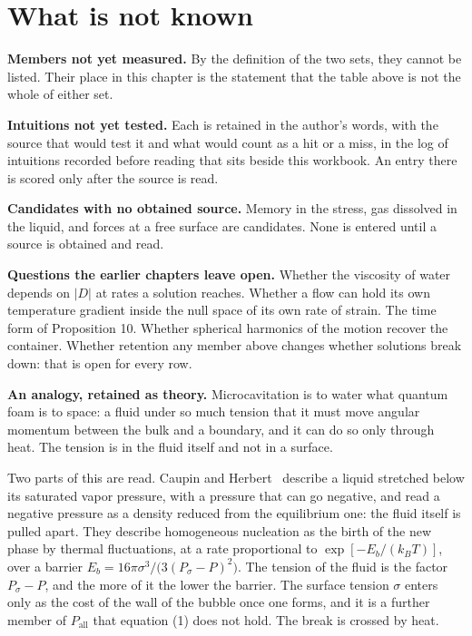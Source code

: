 \section{What is not known}

\textbf{Members not yet measured.} By the definition of the two sets, they cannot be listed. Their
place in this chapter is the statement that the table above is not the whole of either set.

\textbf{Intuitions not yet tested.} Each is retained in the author's words, with the source that would
test it and what would count as a hit or a miss, in the log of intuitions recorded before reading
that sits beside this workbook. An entry there is scored only after the source is read.

\textbf{Candidates with no obtained source.} Memory in the stress, gas dissolved in the liquid, and
forces at a free surface are candidates. None is entered until a source is obtained and read.

\textbf{Questions the earlier chapters leave open.} Whether the viscosity of water depends on $|D|$
at rates a solution reaches. Whether a flow can hold its own temperature gradient inside the null
space of its own rate of strain. The time form of Proposition 10. Whether spherical harmonics of
the motion recover the container. Whether retention any member above changes whether solutions break
down: that is open for every row.

\textbf{An analogy, retained as theory.} Microcavitation is to water what quantum foam is to space: a
fluid under so much tension that it must move angular momentum between the bulk and a boundary,
and it can do so only through heat. The tension is in the fluid itself and not in a surface.

Two parts of this are read. Caupin and Herbert~\cite{src:Caupin-and-Herbert-2006} describe a liquid stretched below its saturated
vapor pressure, with a pressure that can go negative, and read a negative pressure as a density
reduced from the equilibrium one: the fluid itself is pulled apart. They describe homogeneous
nucleation as the birth of the new phase by thermal fluctuations, at a rate proportional to
$\exp[-E_b/(k_BT)]$, over a barrier $E_b = 16\pi\sigma^3/\bigl(3(P_\sigma - P)^2\bigr)$. The tension
of the fluid is the factor $P_\sigma - P$, and the more of it the lower the barrier. The surface
tension $\sigma$ enters only as the cost of the wall of the bubble once one forms, and it is a
further member of $P_{\mathrm{all}}$ that equation (1) does not hold. The break is crossed by heat.

